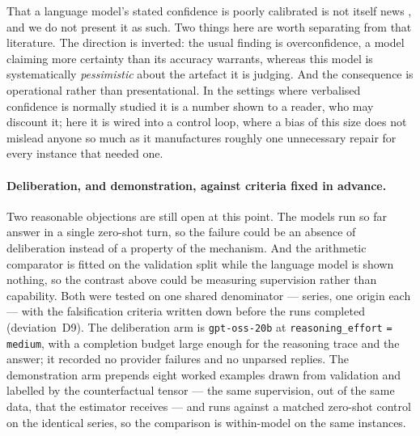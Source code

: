 That a language model's stated confidence is poorly calibrated is not itself news
\citep{kadavath2022know,lin2022verbalized,xiong2024confidence}, and we do not present it
as such. Two things here are worth separating from that literature. The direction is
inverted: the usual finding is overconfidence, a model claiming more certainty than its
accuracy warrants, whereas this model is systematically \emph{pessimistic} about the
artefact it is judging. And the consequence is operational rather than presentational.
In the settings where verbalised confidence is normally studied it is a number shown to
a reader, who may discount it; here it is wired into a control loop, where a bias of
this size does not mislead anyone so much as it manufactures roughly one unnecessary
repair for every instance that needed one.

\begin{table}[htbp]
\centering
\caption{H5: the agent's stated confidence against a calibrated estimate of the same
event. Both predict the probability of a large error, on the same \calN{} instances
and against the same label; lower is better in every column. The constant predictor is
included deliberately: it attains a perfect calibration error while ranking nothing,
which is why ECE is never read here on its own.}
\label{tab:calibration}
\small
\fittable{}
\end{table}

\paragraph{Deliberation, and demonstration, against criteria fixed in advance.}
Two reasonable objections are still open at this point. The models run so far answer in a
single zero-shot turn, so the failure could be an absence of deliberation instead of a
property of the mechanism. And the arithmetic comparator is fitted on the validation
split while the language model is shown nothing, so the contrast above could be measuring
supervision rather than capability. Both were tested on one shared denominator ---
\reasonSeries{} series, one origin each --- with the falsification criteria written down
before the runs completed (deviation~D9). The deliberation arm is \texttt{gpt-oss-20b} at
\texttt{reasoning\_effort} \texttt{= medium}, with a completion budget large enough for
the reasoning trace and the answer; it recorded no provider failures and no unparsed
replies. The demonstration arm prepends eight worked examples drawn from validation and
labelled by the counterfactual tensor --- the same supervision, out of the same data, that
the estimator receives --- and runs against a matched zero-shot control on the identical
series, so the comparison is within-model on the same instances.

